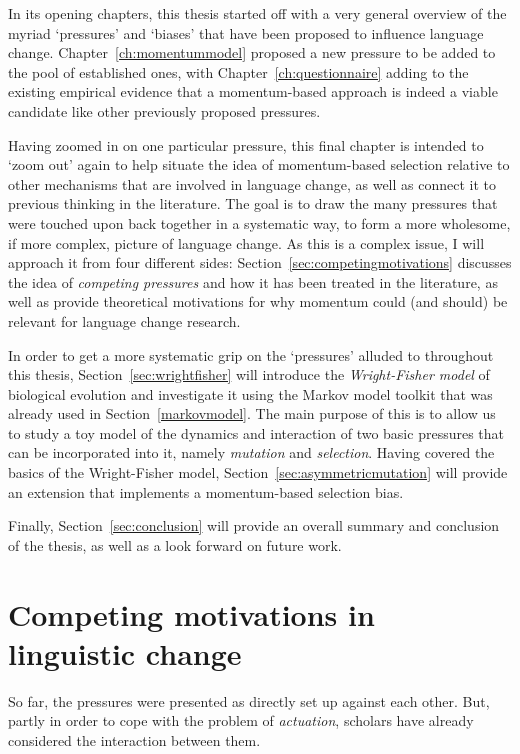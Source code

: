In its opening chapters, this thesis started off with a very general overview of the myriad `pressures' and `biases' that have been proposed to influence language change. Chapter~\ref{ch:momentummodel} proposed a new pressure to be added to the pool of established ones, with Chapter~\ref{ch:questionnaire} adding to the existing empirical evidence that a momentum-based approach is indeed a viable candidate like other previously proposed pressures.

Having zoomed in on one particular pressure, this final chapter is intended to `zoom out' again to help situate the idea of momentum-based selection relative to other mechanisms that are involved in language change, as well as connect it to previous thinking in the literature. %
The goal is to draw the many pressures that were touched upon back together in a systematic way, to form a more wholesome, if more complex, picture of language change. As this is a complex issue, I will approach it from four different sides: Section~\ref{sec:competingmotivations} discusses the idea of \emph{competing pressures} and how it has been treated in the literature, as well as provide theoretical motivations for why momentum could (and should) be relevant for language change research. %

In order to get a more systematic grip on the `pressures' alluded to throughout this thesis, Section~\ref{sec:wrightfisher} will introduce the \emph{Wright-Fisher model} of biological evolution and investigate it using the Markov model toolkit that was already used in Section~\ref{markovmodel}. The main purpose of this is to allow us to study a toy model of the dynamics and interaction of two basic pressures that can be incorporated into it, namely \emph{mutation} and \emph{selection}. Having covered the basics of the Wright-Fisher model, Section~\ref{sec:asymmetricmutation} will provide an extension that implements a momentum-based selection bias.

Finally, Section~\ref{sec:conclusion} will provide an overall summary and conclusion of the thesis, as well as a look forward on future work.


\section{Competing motivations in linguistic change}
\label{sec:competingmotivations}
So far, the pressures were presented as directly set up against each other. But, partly in order to cope with the problem of \emph{actuation},  scholars have already considered the interaction between them.

